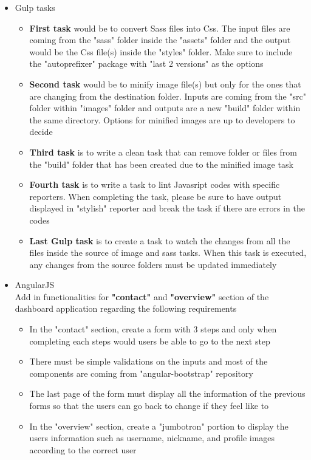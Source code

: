 \documentclass[12pt]{article}
\begin{document}
\begin{itemize}
\begin{itemize}
\begin{itemize}
\begin{verbatim}
				\end{verbatim}
			\end{itemize}
		\item Gulp tasks
			\begin{itemize}
			\item \textbf{First task} would be to convert Sass files into Css. The input files are coming from the "sass" folder inside the "assets" folder and the output would be the Css file(s) inside the "styles" folder. Make sure to include the "autoprefixer" package with "last 2 versions" as the options
			\item \textbf{Second task} would be to minify image file(s) but only for the ones that are changing from the destination folder. Inputs are coming from the "src" folder within "images" folder and outputs are a new "build" folder within the same directory. Options for minified images are up to developers to decide
			\item \textbf{Third task} is to write a clean task that can remove folder or files from the "build" folder that has been created due to the minified image task
			\item \textbf{Fourth task} is to write a task to lint Javasript codes with specific reporters. When completing the task, please be sure to have output displayed in "stylish" reporter and break the task if there are errors in the codes
			\item \textbf{Last Gulp task} is to create a task to watch the changes from all the files inside the source of image and sass tasks. When this task is executed, any changes from the source folders must be updated immediately
			\end{itemize}
		\item AngularJS\\
		Add in functionalities for \textbf{"contact"} and \textbf{"overview"} section of the dashboard application regarding the following requirements
			\begin{itemize}
				\item In the "contact" section, create a form with 3 steps and only when completing each steps would users be able to go to the next step
				\item There must be simple validations on the inputs and most of the components are coming from "angular-bootstrap" repository
				\item The last page of the form must display all the information of the previous forms so that the users can go back to change if they feel like to
				\item In the "overview" section, create a "jumbotron" portion to display the users information such as username, nickname, and profile images according to the correct user

\end{itemize}
\end{itemize}
\end{itemize}
\end{document}
